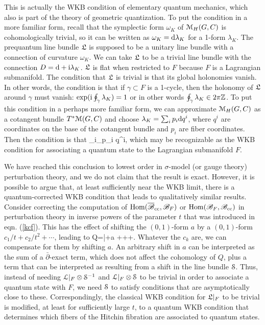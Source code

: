 \documentclass[11pt,a4paper]{article}
\begin{document}
This is actually the WKB condition of elementary quantum mechanics, which also is part of  the theory of geometric quantization.   To put the condition
in a more familiar form, recall that the symplectic form $\omega_K$ of $\M_H(G,C)$ is cohomologically trivial, so it can be written as $\omega_K=\d\lambda_K$
for a 1-form $\lambda_K$.  The prequantum line bundle $\frL$ is supposed to be a unitary line bundle with a connection of curvature $\omega_K$.
We can take $\frL$ to be a trivial line bundle with the connection $D=\d+\i\lambda_K$.   $\frL$ is flat when restricted to $F$ because $F$ is a Lagrangian
submanifold.   The condition that $\frL$ is trivial is that its global holonomies vanish.   In other words, the condition is that if $\gamma\subset F$ is a 1-cycle,
then the holonomy of $\frL$ around $\gamma$ must vanish:   $\exp(\i \oint_\gamma\lambda_K)=1$ or in other words $\oint_\gamma \lambda_K\in 2\pi\Z$.
To put this condition in a perhaps more familiar form, we can approximate $\M_H(G,C)$ as a cotangent bundle $T^*\M(G,C)$
 and choose $\lambda_K=\sum_i p_i\d q^i$, where $q^i$ are coordinates on the base of the cotangent bundle and $p_i$ are fiber coordinates.  Then
 the condition is that
 \be\label{weffo}\sum_i\oint_\gamma p_i \d q^i\pi \Z,\ee
 which may be recognizable as the WKB condition for associating a quantum state to the Lagrangian submanifold $F$.   
 
 We have reached this conclusion to lowest order in $\sigma$-model (or gauge theory) perturbation theory, and we do not claim that the result is exact.
 However, it is possible to argue that, at least sufficiently near the WKB limit, there is a quantum-corrected WKB condition that leads to qualitatively
 similar results.   Consider correcting the
 computation of $\Hom(\b\B_\cc,\B_F)$ or $\Hom(\B_F,\B_\cc)$ in perturbation theory in inverse powers of the parameter $t$ that was introduced in
 eqn. (\ref{kcf}).   This has the effect of shifting the $(0,1)$-form $a$ by a $(0,1)$-form $c_1/t+c_2/t^2+\cdots$, leading to
 \be\label{zeflo}Q=\bar\partial+a +++\cdots .\ee
 Whatever the $c_k$ are, we can compensate for them by shifting $a$.   An arbitrary shift in $a$ can be interpreted as the sum of a $\bar\partial$-exact
 term, which does not affect the cohomology of $Q$, plus a term that can be interpreted as resulting from a shift in the line bundle $\S$.   Thus, instead of needing
 $\L|_F\otimes \S^{-1}$ and $\L|_F\otimes \S$ to be trivial in order to associate a quantum state with $F$, we need $\S$ to satisfy conditions
 that are asymptotically close to these.    Correspondingly, the classical WKB condition for $\frL|_F$ to be trivial is modified, at least for
 sufficiently large $t$, to a quantum WKB condition that determines which fibers of the Hitchin fibration are associated to quantum states.
\end{document}
